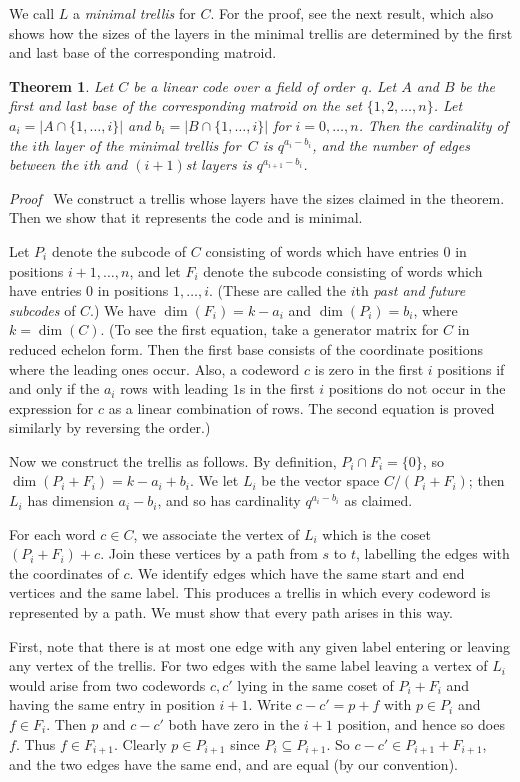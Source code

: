 \documentclass[12pt]{article}
\newtheorem{theorem}{Theorem}[section]
\newcommand{\head}[1]{\medbreak\noindent\textit{#1}\ }
\begin{document}
We call $L$ a \emph{minimal trellis} for $C$. For the proof, see
the next result, which also shows how the sizes of the layers in the
minimal trellis are determined by the first and last base of the
corresponding matroid.

\begin{theorem}
Let $C$ be a linear code over a field of order~$q$. Let $A$ and
$B$ be the first and last base of the corresponding matroid on
the set $\{1,2,\ldots,n\}$. Let $a_i=|A\cap\{1,\ldots,i\}|$ and
$b_i=|B\cap\{1,\ldots,i\}|$ for $i=0, \ldots, n$. Then the
cardinality of the $i$th layer of the minimal trellis for~$C$ is
$q^{a_i-b_i}$, and the number of edges between the $i$th and
$(i+1)$st layers is $q^{a_{i+1}-b_i}$.
\end{theorem}

\head{Proof} We construct a trellis whose layers have the sizes
claimed in the theorem. Then we show that it represents the code
and is minimal.

Let $P_i$ denote the subcode of $C$ consisting of words which
have entries $0$ in positions $i+1, \ldots, n$, and let $F_i$
denote the subcode consisting of words which have  entries $0$ in
positions $1, \ldots, i$. (These are called the $i$th \emph{past
and future subcodes} of $C$.) We have $\dim(F_i)=k-a_i$ and
$\dim(P_i)=b_i$, where $k=\dim(C)$. (To see the first equation,
take a generator matrix for $C$ in reduced echelon form. Then
the first base consists of the coordinate positions where the
leading ones occur. Also, a codeword $c$ is zero in the first $i$
positions if and only if the $a_i$ rows with leading $1$s in
the first $i$ positions do not occur in the expression for $c$
as a linear combination of rows. The second equation is proved
similarly by reversing the order.)

Now we construct the trellis as follows. By definition,
$P_i\cap F_i=\{0\}$, so $\dim(P_i+F_i)=k-a_i+b_i$. We let $L_i$
be the vector space $C/(P_i+F_i)$; then $L_i$ has dimension
$a_i-b_i$, and so has cardinality $q^{a_i-b_i}$ as claimed.

For each word $c\in C$, we associate the vertex of $L_i$
which is the coset $(P_i+F_i)+c$. Join these vertices by a
path from $s$ to $t$, labelling the edges with the coordinates
of $c$. We identify edges which have the same start and end vertices
and the same label. This produces a trellis in which every
codeword is represented by a path. We must show that every path
arises in this way.

First, note that there is at most one edge with any given label
entering or leaving any vertex of the trellis. For two edges
with the same label leaving a vertex of $L_i$ would arise from
two codewords $c,c'$ lying in the same coset of $P_i+F_i$ and
having the same entry in position $i+1$. Write $c-c'=p+f$ with
$p\in P_i$ and $f\in F_i$. Then $p$ and $c-c'$ both have zero
in the $i+1$ position, and hence so does $f$. Thus $f\in F_{i+1}$.
Clearly $p\in P_{i+1}$ since $P_i\subseteq P_{i+1}$. So
$c-c'\in P_{i+1}+F_{i+1}$, and the two edges have the same end,
and are equal (by our convention).
\end{document}
